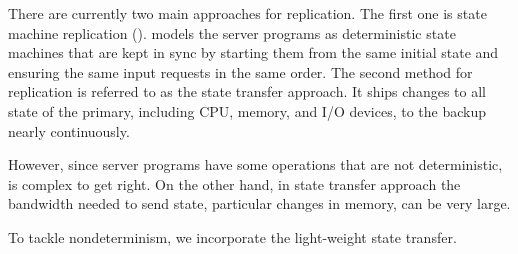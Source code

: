 There are currently two main approaches for replication. The first one is state machine 
replication (\smr). \smr models the server programs as deterministic state machines that are 
kept in sync by starting them from the same initial state and ensuring the same input 
requests in the same order. The second method for replication is referred to as the state transfer 
approach. It ships changes to all state of the primary, including CPU, memory, and I/O devices, 
to the backup nearly continuously.

However, since server programs have some operations that are not deterministic, \smr is complex to get right. 
On the other hand, in state transfer approach the bandwidth needed to send state, particular 
changes in memory, can be very large.


To tackle nondeterminism, we incorporate the light-weight state transfer. 
